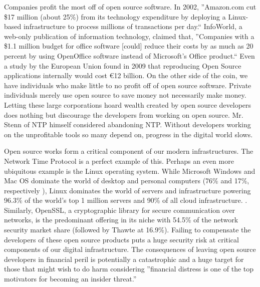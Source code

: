 \documentclass[format=sigconf]{acmart}
\begin{document}
Companies profit the most off of open source software. In 2002, ''Amazon.com cut \$17 million (about 25\%) from its technology expenditure by deploying a Linux-based infrastructure to process millions of transactions per day.`` \cite{amazon}  InfoWorld, a web-only publication of information technology, claimed that, ''Companies with a \$1.1 million budget for office software [could] reduce their costs by as much as 20 percent by using OpenOffice software instead of Microsoft's Office product.`` \cite{infoworld} Even a study by the European Union   found in 2009 that reproducing Open Source applications internally would cost \euro{}12 billion. \cite{eu} On the other side of the coin, we have individuals who make little to no profit off of open source software. Private individuals merely use open source to save money not necessarily make money. Letting these large corporations hoard wealth created by open source developers does nothing but discourage the developers from working on open source. Mr. Stenn of NTP himself considered abandoning NTP. Without developers working on the unprofitable tools so many depend on, progress in the digital world slows.

Open source works form a critical component of our modern infrastructures. The Network Time Protocol is a perfect example of this. Perhaps an even more ubiquitous example is the Linux operating system. While Microsoft Windows and Mac OS dominate the world of desktop and personal computers (76\% and 17\%, respectively \cite{osuse}), Linux dominates the world of servers and infrastructure powering 96.3\% of the world's top 1 million servers and 90\% of all cloud infrastructure. \cite{hosting}. Similarly, OpenSSL, a cryptographic library for secure communication over networks, is the predominant offering in its niche with 54.5\% of the network security market share (followed by Thawte at 16.9\%). \cite{enlyft} Failing to compensate the developers of these open source products puts a huge security risk at critical components of our digital infrastructure. The consequences of leaving open source developers in financial peril is potentially a catastrophic and a huge target for those that might wish to do harm considering ''financial distress is one of the top motivators for becoming an insider threat.'' \cite{insider}
\end{document}
